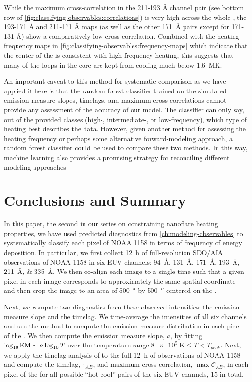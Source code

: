 While the maximum cross-correlation in the 211-193 \si{\angstrom} channel pair (see bottom row of \autoref{fig:classifying-observables:correlations}) is very high across the whole \AR{}, the 193-171 \si{\angstrom} and 211-171 \si{\angstrom} maps (as well as the other \SI{171}{\angstrom} pairs except for 171-131 \si{\angstrom}) show a comparatively low cross-correlation. Combined with the heating frequency maps in \autoref{fig:classifying-observables:frequency-maps} which indicate that the center of the \AR{} is consistent with high-frequency heating, this suggests that many of the loops in the core are kept from cooling much below \SI{1.6}{\mega\kelvin}.

An important caveat to this method for systematic comparison as we have applied it here is that the random forest classifier trained on the simulated emission measure slopes, timelags, and maximum cross-correlations cannot provide any assessment of the accuracy of our model. The classifier can only say, out of the provided classes (high-, intermediate-, or low-frequency), which type of heating best describes the data. However, given another method for assessing the heating frequency or perhaps some alternative forward-modeling approach, a random forest classifier could be used to compare these two methods. In this way, machine learning also provides a promising strategy for reconciling different modeling approaches.

\section{Conclusions and Summary}\label{sec:classifying-observables:conclusions}

In this paper, the second in our series on constraining nanoflare heating properties, we have used predicted diagnostics from \autoref{ch:modeling-observables} to systematically classify each pixel of \AR{} NOAA 1158 in terms of frequency of energy deposition. In particular, we first collect \SI{12}{\hour} of full-resolution SDO/AIA observations of NOAA 1158 in six EUV channels: \SIlist{94;131;171;193;211;335}{\angstrom}. We then co-align each image to a single time such that a given pixel in each image corresponds to approximately the same spatial coordinate and then crop the image to an area of \SI{500}{\arcsecond}-by-\SI{500}{\arcsecond} centered on the \AR{}.

Next, we compute two diagnostics from these observed intensities: the emission measure slope and the timelag. We time-average the intensities of all six channels and use the method \citet{hannah_differential_2012} to compute the emission measure distribution in each pixel of the \AR{}. We then compute the emission measure slope, $a$, by fitting $\log_{10}\textup{EM}\sim a\log_{10}T$ over the temperature range $\SI{8e5}{\kelvin}\le T < T_{peak}$. Next, we apply the timelag analysis of \citet{viall_evidence_2012} to the full \SI{12}{\hour} of observations of NOAA 1158 and compute the timelag, $\tau_{AB}$, and maximum cross-correlation, $\max\mathcal{C}_{AB}$, in each pixel of the \AR{} for all possible ``hot-cool'' pairs of the six EUV channels, 15 in total.

